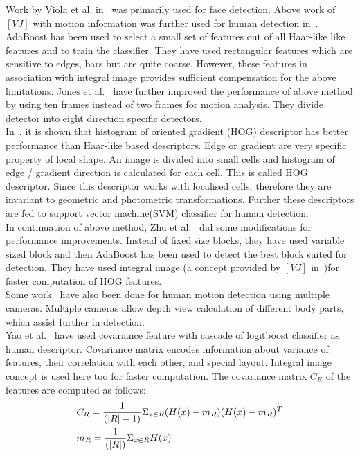 \indent Work by Viola et al. in~\cite{17} was primarily used for
face detection. Above work of $[VJ]$ with motion information was further
used for human detection in~\cite{16}. AdaBoost has been used to
select a small set of features out of all Haar-like like features and to
train the classifier. They have used rectangular features which are
sensitive to edges, bars but are quite coarse. However, these features
in association with integral image provides sufficient compensation for
the above limitations. Jones et al.~\cite{26} have further improved
the performance of above method by using ten frames instead of two frames
for motion analysis. They divide detector into eight direction specific
detectors.\\
\indent In~\cite{20, 21}, it is shown that histogram of oriented
gradient (HOG) descriptor has better performance than Haar-like based
descriptors. Edge or gradient are very specific property of local shape.
An image is divided into small cells and histogram of edge / gradient
direction is calculated for each cell. This is called HOG descriptor.
Since this descriptor works with localised cells, therefore they are
invariant to geometric and photometric transformations. Further these
descriptors are fed to support vector machine(SVM) classifier for human
detection.\\
\indent In continuation of above method, Zhu et al.~\cite{20} did some
modifications for performance improvements. Instead of fixed size
blocks, they have used variable sized block and then AdaBoost has been
used to detect the best block suited for detection. They have used
integral image (a concept provided by $[VJ]$ in~\cite{17})for faster
computation of HOG features.\\
\indent Some work~\cite{30} have also been done for human motion
detection using multiple cameras. Multiple cameras allow depth view
calculation of different body parts, which assist further in
detection.\\
\indent Yao et al.~\cite{25} have used covariance feature with cascade
of logitboost classifier as human descriptor. Covariance matrix encodes
information about variance of features, their correlation with each
other, and special layout. Integral image concept is used here too for
faster computation. The covariance matrix $C_R$ of the features are
computed as follows:
\begin{equation}
\begin{aligned}
& C_R = {1 \over {(|R| - 1)}} \Sigma _{x \in R} (H(x) - m_R) (H(x) - m_R)^T\\
& m_R = {1 \over {(|R|)}} \Sigma _{x \in R} H(x)
\end{aligned}
\end{equation}
